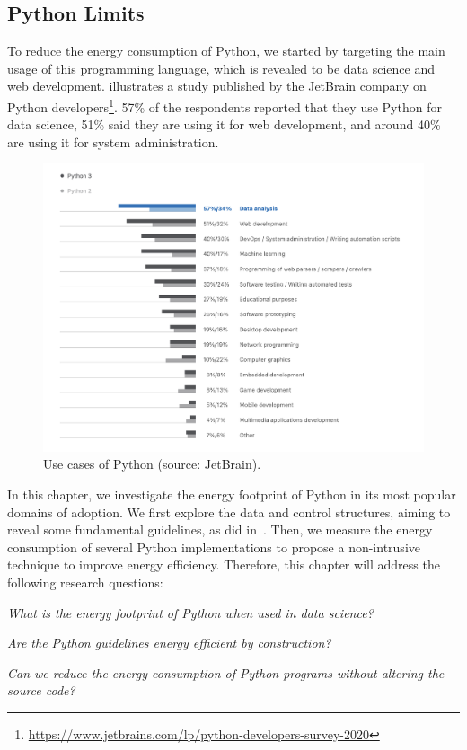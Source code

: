 \subsection{Python Limits}
To reduce the energy consumption of Python, we started by targeting the main usage of this programming language, which is revealed to be data science and web development.
 illustrates a study published by the JetBrain company on Python developers\footnote{\url{https://www.jetbrains.com/lp/python-developers-survey-2020}}.
57\% of the respondents reported that they use Python for data science, 51\% said they are using it for web development, and around 40\% are using it for system administration.


\begin{figure}[hbt]
    \centering
    \includegraphics[width=\linewidth]{imgs/python_use_cases}
    \caption{Use cases of Python (source: JetBrain).}
    \label{fig:usecase}
\end{figure}

In this chapter, we investigate the energy footprint of Python in its most popular domains of adoption.
We first explore the data and control structures, aiming to reveal some fundamental guidelines, as \citeauthor{s} did in~\cite{hasan_energy_2016-1}.
Then, we measure the energy consumption of several Python implementations to propose a non-intrusive technique to improve energy efficiency.
Therefore, this chapter will address the following research questions:
\begin{compactenum}[\indent\bf RQ\,1:]
    \item \emph{What is the energy footprint of Python when used in data science?}
    \item \emph{Are the Python guidelines energy efficient by construction?}
    \item \emph{Can we reduce the energy consumption of Python programs without altering the source code?}
\end{compactenum}

